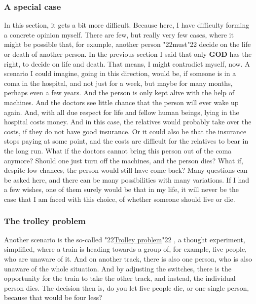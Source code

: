 \documentclass[12pt,a5paper]{article}
\newcommand{\God}[0]{\textbf{GOD}}
\newcommand{\q}[1]{\char"22{#1}\char"22 }
\begin{document}
	\subsubsection{A special case}
		In this section,
		it gets a bit more difficult.
		Because here,
		I have difficulty forming a concrete opinion myself.
		There are few,
		but really very few cases,
		where it might be possible that,
		for example,
		another person \q{must} decide on the life or death of another person.
		In the previous section I said that only {\God} has the right,
		to decide on life and death.
		That means,
		I might contradict myself,
		now.
		A scenario I could imagine,
		going in this direction,
		would be,
		if someone is in a coma in the hospital,
		and not just for a week,
		but maybe for many months,
		perhaps even a few years.
		And the person is only kept alive with the help of machines.
		And the doctors see little chance that the person will ever wake up again.
		And,
		with all due respect for life and fellow human beings,
		lying in the hospital costs money.
		And in this case,
		the relatives would probably take over the costs,
		if they do not have good insurance.
		Or it could also be that the insurance stops paying at some point,
		and the costs are difficult for the relatives to bear in the long run.
		What if the doctors cannot bring this person out of the coma anymore?
		Should one just turn off the machines,
		and the person dies?
		What if,
		despite low chances,
		the person would still have come back?
		Many questions can be asked here,
		and there can be many possibilities with many variations.
		If I had a few wishes,
		one of them surely would be that in my life,
		it will never be the case that I am faced with this choice,
		of whether someone should live or die.
		
	\subsubsection{The trolley problem}
		Another scenario is the so-called \q{\href{https://en.wikipedia.org/wiki/Trolley_problem}{Trolley problem}},
		a thought experiment,
		simplified,
		where a train is heading towards a group of,
		for example,
		five people,
		who are unaware of it.
		And on another track,
		there is also one person,
		who is also unaware of the whole situation.
		And by adjusting the switches,
		there is the opportunity for the train to take the other track,
		and instead,
		the individual person dies.
		The decision then is,
		do you let five people die,
		or one single person,
		because that would be four less?
		
\end{document}
